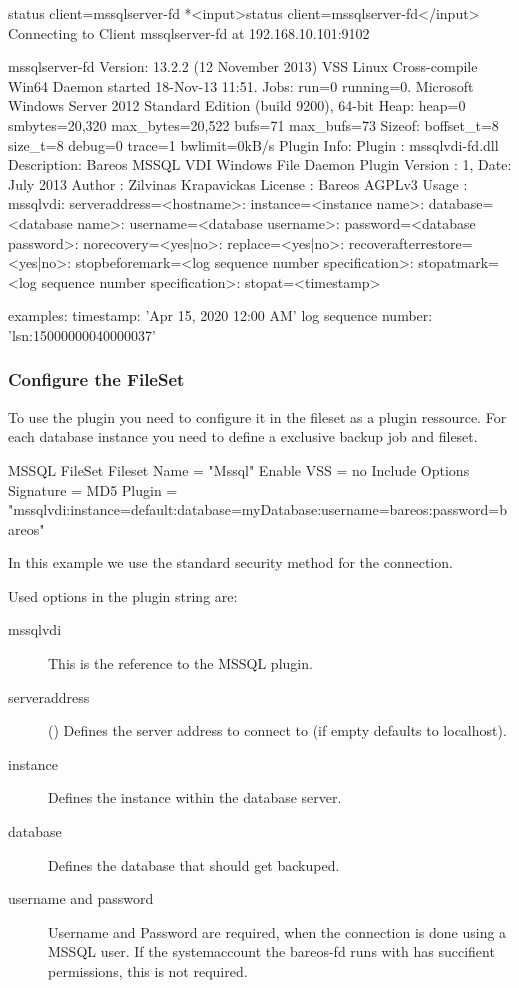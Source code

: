 \begin{bconsole}{status client=mssqlserver-fd}
*<input>status client=mssqlserver-fd</input>
Connecting to Client mssqlserver-fd at 192.168.10.101:9102

mssqlserver-fd Version: 13.2.2 (12 November 2013)  VSS Linux Cross-compile Win64
Daemon started 18-Nov-13 11:51. Jobs: run=0 running=0.
Microsoft Windows Server 2012 Standard Edition (build 9200), 64-bit
 Heap: heap=0 smbytes=20,320 max_bytes=20,522 bufs=71 max_bufs=73
 Sizeof: boffset_t=8 size_t=8 debug=0 trace=1 bwlimit=0kB/s
Plugin Info:
 Plugin     : mssqlvdi-fd.dll
 Description: Bareos MSSQL VDI Windows File Daemon Plugin
 Version    : 1, Date: July 2013
 Author     : Zilvinas Krapavickas
 License    : Bareos AGPLv3
 Usage      :
  mssqlvdi:
  serveraddress=<hostname>:
  instance=<instance name>:
  database=<database name>:
  username=<database username>:
  password=<database password>:
  norecovery=<yes|no>:
  replace=<yes|no>:
  recoverafterrestore=<yes|no>:
  stopbeforemark=<log sequence number specification>:
  stopatmark=<log sequence number specification>:
  stopat=<timestamp>

 examples:
  timestamp: 'Apr 15, 2020 12:00 AM'
  log sequence number: 'lsn:15000000040000037'
\end{bconsole}

\subsubsection{Configure the FileSet}
To use the plugin you need to configure it in the fileset as a plugin ressource. For each database instance you need to define a exclusive backup job and fileset.

\begin{bconfig}{MSSQL FileSet}
Fileset {
  Name = "Mssql"
  Enable VSS = no
  Include {
    Options {
      Signature = MD5
    }
    Plugin = "mssqlvdi:instance=default:database=myDatabase:username=bareos:password=bareos"
  }
}
\end{bconfig}

In this example we use the standard security method for the connection.

Used options in the plugin string are:

\begin{description}
  \item[mssqlvdi]
  This is the reference to the MSSQL plugin.
  \item[serveraddress] () Defines the server address to connect to (if empty defaults to localhost).
  \item[instance] Defines the instance within the database server.
  \item[database] Defines the database that should get backuped.
  \item[username and password] Username and Password are required, when the connection is done using a MSSQL user. If the systemaccount the bareos-fd runs with has succifient permissions, this is not required.
\end{description}

